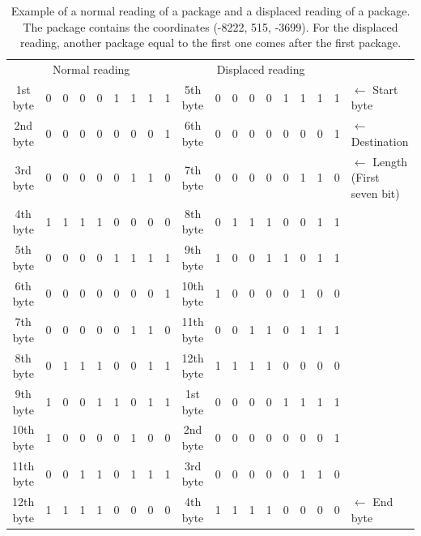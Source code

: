 \begin{table}[H]
\centering
\begin{tabular}{c | m{0.1cm} m{0.1cm} m{0.1cm} m{0.1cm} m{0.1cm} m{0.1cm} m{0.1cm} m{0.1cm} | c | m{0.1cm} m{0.1cm} m{0.1cm} m{0.1cm} m{0.1cm} m{0.1cm} m{0.1cm} m{0.1cm} | l }
\multicolumn{9}{c}{Normal reading} & \multicolumn{9}{c}{Displaced reading} &  \\
\cline{2-9} \cline{11-18}
1st byte & 0 & 0 & 0 & 0 & 1 & 1 & 1 & 1 & 5th byte & 0 & 0 & 0 & 0 & 1 & 1 & 1 & 1 & $\leftarrow$ Start byte \\
\cline{2-9} \cline{11-18}
2nd byte & 0 & 0 & 0 & 0 & 0 & 0 & 0 & 1 & 6th byte & 0 & 0 & 0 & 0 & 0 & 0 & 0 & 1 & $\leftarrow$ Destination \\
\cline{2-9} \cline{11-18}
3rd byte & 0 & 0 & 0 & 0 & 0 & 1 & 1 & 0 & 7th byte & 0 & 0 & 0 & 0 & 0 & 1 & 1 & 0 & $\leftarrow$ Length (First seven bit)\\
\cline{2-9} \cline{11-18}
4th byte & 1 & 1 & 1 & 1 & 0 & 0 & 0 & 0 & 8th byte & 0 & 1 & 1 & 1 & 0 & 0 & 1 & 1 & \\
\cline{2-9} \cline{11-18}
5th byte & 0 & 0 & 0 & 0 & 1 & 1 & 1 & 1 & 9th byte & 1 & 0 & 0 & 1 & 1 & 0 & 1 & 1 & \\
\cline{2-9} \cline{11-18}
6th byte & 0 & 0 & 0 & 0 & 0 & 0 & 0 & 1 & 10th byte & 1 & 0 & 0 & 0 & 0 & 1 & 0 & 0 & \\
\cline{2-9} \cline{11-18}
7th byte & 0 & 0 & 0 & 0 & 0 & 1 & 1 & 0 & 11th byte & 0 & 0 & 1 & 1 & 0 & 1 & 1 & 1 & \\
\cline{2-9} \cline{11-18}
8th byte & 0 & 1 & 1 & 1 & 0 & 0 & 1 & 1 & 12th byte & 1 & 1 & 1 & 1 & 0 & 0 & 0 & 0 & \\
\cline{2-9} \cline{11-18}
9th byte & 1 & 0 & 0 & 1 & 1 & 0 & 1 & 1 & 1st byte & 0 & 0 & 0 & 0 & 1 & 1 & 1 & 1 & \\
\cline{2-9} \cline{11-18}
10th byte & 1 & 0 & 0 & 0 & 0 & 1 & 0 & 0 & 2nd byte & 0 & 0 & 0 & 0 & 0 & 0 & 0 & 1 & \\
\cline{2-9} \cline{11-18}
11th byte & 0 & 0 & 1 & 1 & 0 & 1 & 1 & 1 & 3rd byte & 0 & 0 & 0 & 0 & 0 & 1 & 1 & 0 & \\
\cline{2-9} \cline{11-18}
12th byte & 1 & 1 & 1 & 1 & 0 & 0 & 0 & 0 & 4th byte & 1 & 1 & 1 & 1 & 0 & 0 & 0 & 0 & $\leftarrow$ End byte\\
\cline{2-9} \cline{11-18}
\end{tabular}
\caption{Example of a normal reading of a package and a displaced reading of a package. The package contains the coordinates (-8222, 515, -3699). For the displaced reading, another package equal to the first one comes after the first package.}
\label{errorPro}
\end{table}

